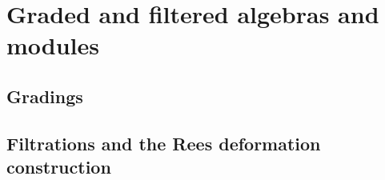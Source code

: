 \section{Graded and filtered algebras and modules}
    \subsection{Gradings}

    \subsection{Filtrations and the Rees deformation construction}
